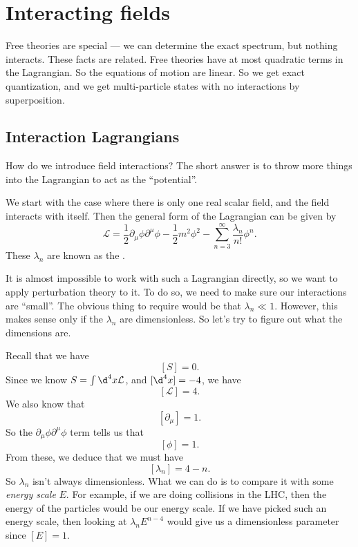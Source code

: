 \documentclass[a4paper]{article}
\begin{document}
\section{Interacting fields}
Free theories are special --- we can determine the exact spectrum, but nothing interacts. These facts are related. Free theories have at most quadratic terms in the Lagrangian. So the equations of motion are linear. So we get exact quantization, and we get multi-particle states with no interactions by superposition.

\subsection{Interaction Lagrangians}
How do we introduce field interactions? The short answer is to throw more things into the Lagrangian to act as the ``potential''.

We start with the case where there is only one real scalar field, and the field interacts with itself. Then the general form of the Lagrangian can be given by
\[
  \mathcal{L} = \frac{1}{2} \partial_\mu \phi \partial^\mu \phi - \frac{1}{2}m^2 \phi^2 - \sum_{n = 3}^\infty \frac{\lambda_n}{n!} \phi^n.
\]
These $\lambda_n$ are known as the .

It is almost impossible to work with such a Lagrangian directly, so we want to apply perturbation theory to it. To do so, we need to make sure our interactions are ``small''. The obvious thing to require would be that $\lambda_n \ll 1$. However, this makes sense only if the $\lambda_n$ are dimensionless. So let's try to figure out what the dimensions are.

Recall that we have
\[
  [S] = 0.
\]
Since we know $S = \int \d^4 x \mathcal{L}$, and $[\d^4 x] = -4$, we have
\[
  [\mathcal{L}] = 4.
\]
We also know that
\[
  [\partial_\mu] = 1.
\]
So the $\partial_\mu \phi \partial^\mu \phi$ term tells us that
\[
  [\phi] = 1.
\]
From these, we deduce that we must have
\[
  [\lambda_n] = 4 - n.
\]
So $\lambda_n$ isn't always dimensionless. What we can do is to compare it with some \emph{energy scale} $E$. For example, if we are doing collisions in the LHC, then the energy of the particles would be our energy scale. If we have picked such an energy scale, then looking at $\lambda_n E^{n - 4}$ would give us a dimensionless parameter since $[E] = 1$.
\end{document}

